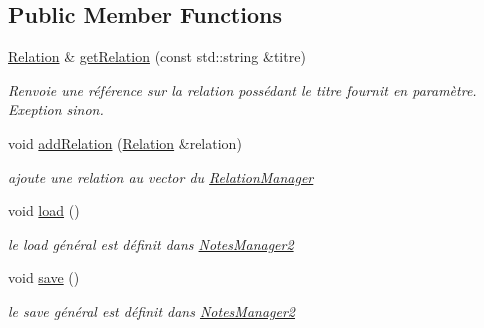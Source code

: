 \subsection*{Public Member Functions}
\begin{DoxyCompactItemize}
\item 
\hyperlink{class_relation}{Relation} \& \hyperlink{class_relation_manager_a7e5900e270c2249831355c70b2fd94b8}{get\+Relation} (const std\+::string \&titre)
\begin{DoxyCompactList}\small\item\em Renvoie une référence sur la relation possédant le titre fournit en paramètre. Exeption sinon. \end{DoxyCompactList}\item 
void \hyperlink{class_relation_manager_a2933861a9b973a35031e799ef9d369b5}{add\+Relation} (\hyperlink{class_relation}{Relation} \&relation)
\begin{DoxyCompactList}\small\item\em ajoute une relation au vector du \hyperlink{class_relation_manager}{Relation\+Manager} \end{DoxyCompactList}\item 
\mbox{\label{class_relation_manager_a593a538680d22c21a8d1a8dd981f6b44}} 
void \hyperlink{class_relation_manager_a593a538680d22c21a8d1a8dd981f6b44}{load} ()
\begin{DoxyCompactList}\small\item\em le load général est définit dans \hyperlink{class_notes_manager2}{Notes\+Manager2} \end{DoxyCompactList}\item 
\mbox{\label{class_relation_manager_ac9b805487819264d8ef7faab68521822}} 
void \hyperlink{class_relation_manager_ac9b805487819264d8ef7faab68521822}{save} ()
\begin{DoxyCompactList}\small\item\em le save général est définit dans \hyperlink{class_notes_manager2}{Notes\+Manager2} \end{DoxyCompactList}\end{DoxyCompactItemize}
